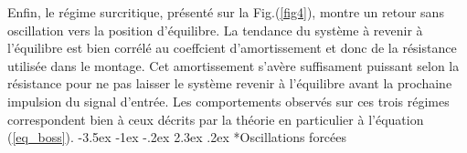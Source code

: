 \documentclass[a4paper, 12pt,oneside]{article}
\makeatletter
\renewcommand{\subsection}{\@startsection {subsection}{1}{\z@}%
             {-3.5ex \@plus -1ex \@minus -.2ex}%
             {2.3ex \@plus.2ex}%
             {\normalfont\normalsize\bfseries}}
\makeatother
\begin{document}
Enfin, le régime surcritique, présenté sur la Fig.(\ref{fig4}), montre un retour sans oscillation vers la position d'équilibre. La tendance du système à revenir à l'équilibre est bien corrélé au coeffcient d'amortissement et donc de la résistance utilisée dans le montage. Cet amortissement s'avère suffisament puissant selon la résistance pour ne pas laisser le système revenir à l'équilibre avant la prochaine impulsion du signal d'entrée.
Les comportements observés sur ces trois régimes correspondent bien à ceux décrits par la théorie en particulier à l'équation (\ref{eq_boss}).
\vspace{-0.4cm}
\subsection*{Oscillations forcées}
\end{document}
